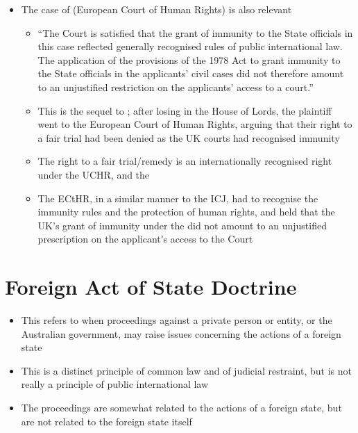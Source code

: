 \begin{itemize}
    \item The case of  (European Court of Human Rights) is also relevant
    \begin{itemize}
        \item ``The Court is satisfied that the grant of immunity to the State officials in this case reflected generally recognised rules of public international law. The application of the provisions of the 1978 Act to grant immunity to the State officials in the applicants' civil cases did not therefore amount to an unjustified restriction on the applicants' access to a court.''
        \item This is the sequel to ; after losing in the House of Lords, the plaintiff went to the European Court of Human Rights, arguing that their right to a fair trial had been denied as the UK courts had recognised immunity
        \item The right to a fair trial/remedy is an internationally recognised right under the UCHR, and the 
        \item The ECtHR, in a similar manner to the ICJ, had to recognise the immunity rules and the protection of human rights, and held that the UK's grant of immunity under the  did not amount to an unjustified prescription on the applicant's access to the Court 
    \end{itemize}
\end{itemize}

\section{Foreign Act of State Doctrine}\label{sec:Foreign Act of State Doctrine}
\begin{itemize}
    \item This refers to when proceedings against a private person or entity, or the Australian government, may raise issues concerning the actions of a foreign state
    \item This is a distinct principle of common law and of judicial restraint, but is not really a principle of public international law
    \item The proceedings are somewhat related to the actions of a foreign state, but are not related to the foreign state itself
\end{itemize}

